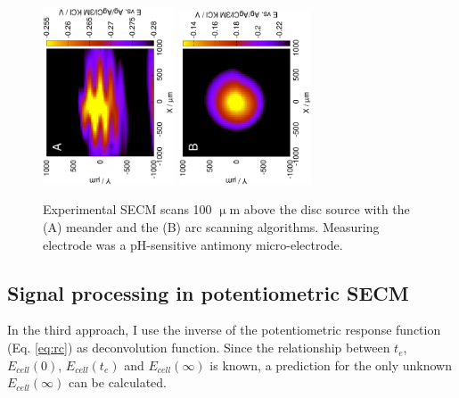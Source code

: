 \begin{figure}
\centering
\includegraphics[trim = 10mm 30mm 0mm 10mm, clip, width=0.35\textwidth, angle=-90]{img/polar/meander.eps} \includegraphics[trim = 10mm 30mm 0mm 10mm, clip, width=0.35\textwidth, angle=-90]{img/polar/arc.eps}
\caption{Experimental SECM scans 100 $\upmu$m above the disc source with the (A) meander and the (B) arc scanning algorithms.
Measuring electrode was a pH-sensitive antimony micro-electrode.}
\label{fig:simulations}
\end{figure}

\subsection{Signal processing in potentiometric SECM}
In the third approach, I use the inverse of the potentiometric response function (Eq. \ref{eq:rc}) as deconvolution function.
Since the relationship between $t_e$, $E_{cell}(0)$, $E_{cell}(t_e)$ and $E_{cell}(\infty)$ is known, a prediction for the only unknown $E_{cell}(\infty)$ can be calculated.


